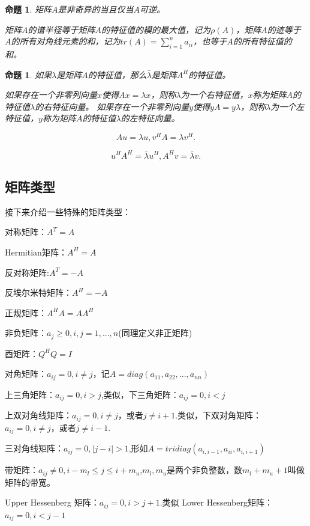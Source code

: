 \documentclass{article}
\begin{document}
\newtheorem{proposition}{命题}
\begin{proposition}
矩阵$A$是非奇异的当且仅当$A$可逆。

矩阵$A$的谱半径等于矩阵$A$的特征值的模的最大值，记为$\rho (A)$，矩阵$A$的迹等于$A$的所有对角线元素的和，记为$tr(A)=\sum_{i=1}^n a_{ii}$，也等于$A$的所有特征值的和。
\end{proposition}

\newtheorem{proposition}{命题}
\begin{proposition}
如果$\lambda$是矩阵$A$的特征值，那么$\bar\lambda$是矩阵$A^H$的特征值。

如果存在一个非零列向量$x$使得$Ax=\lambda x$，则称$\lambda $为一个右特征值，$x$称为矩阵$A$的特征值$\lambda $的右特征向量。
如果存在一个非零列向量$y$使得$yA=y\lambda$，则称$\lambda $为一个左特征值，$y$称为矩阵$A$的特征值$\lambda $的左特征向量。

$$Au=\lambda u,v^HA=\lambda v^H.$$

$$u^HA^H=\bar{\lambda}u^H,A^Hv=\bar{\lambda}v.$$
\end{proposition}

\subsection{矩阵类型}
接下来介绍一些特殊的矩阵类型：

对称矩阵：$A^T=A$

Hermitian矩阵：$A^H=A$

反对称矩阵:$A^T=-A$

反埃尔米特矩阵：$A^H=-A$

正规矩阵：$A^HA=AA^H$

非负矩阵：$a_{j}\ge 0,i,j=1,...,n$(同理定义非正矩阵)

酉矩阵：$Q^HQ=I$

对角矩阵：$a_{ij}=0,i\neq j$，记$A=diag(a_{11},a_{22},...,a_{nn})$

上三角矩阵：$a_{ij}=0,i>j$,类似，下三角矩阵：$a_{ij}=0,i<j$

上双对角线矩阵：$a_{ij}=0,i\neq j$，或者$j\neq i+1$.类似，下双对角矩阵：$a_{ij}=0,i\neq j$，或者$j\neq i-1$.

三对角线矩阵：$a_{ij}=0,|j-i|>1$,形如$A=tridiag(a_{i,i-1},a_{ii},a_{i,i+1})$

带矩阵：$a_{ij}\neq 0,i-m_l\leqslant j\leqslant i+m_u$,$m_l,m_u$是两个非负整数，数$m_l+m_u+1$叫做矩阵的带宽。

Upper Hessenberg 矩阵：$a_{ij}=0,i>j+1$.类似 Lower Hessenberg矩阵：$a_{ij}=0,i<j-1$
\end{document}
